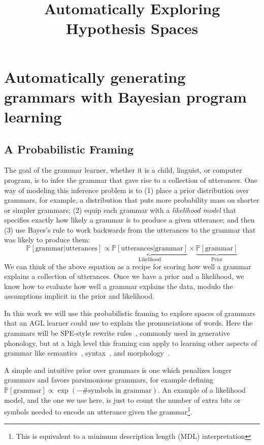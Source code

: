 \documentclass{article}
\title{Automatically Exploring Hypothesis Spaces}
\newcommand{\probability}{\mathds{P}} %
\begin{document}
\maketitle


\section{Automatically generating grammars with Bayesian program learning}

\subsection{A Probabilistic Framing}

The goal of the grammar learner, whether it is a child, linguist, or computer program, is to
infer the grammar that gave rise to
a collection of utterances.
One way of
modeling this inference problem is to (1) place a prior distribution over grammars, for example, a distribution that puts more probability mass on shorter or simpler grammars; (2) equip each grammar with a
\emph{likelihood model} that specifies exactly how likely a grammar is to produce a given utterance;
and then (3) use Bayes's rule to work backwards from the
utterances to the grammar that was likely to produce them:
\begin{equation}
  \probability\left[\text{grammar}|\text{utterances} \right]\propto\underbrace{\probability\left[\text{utterances}|\text{grammar} \right]}_{\text{Likelihood}}\times\underbrace{\probability\left[\text{grammar} \right]}_{\text{Prior}}\label{posterior}
\end{equation}
We can think of the above equation as a recipe for
scoring how well a grammar explains a
collection of utterances.
Once we have a prior and a likelihood,
we know how to evaluate how well a grammar explains the data, modulo the assumptions implicit in the
prior and likelihood.

In this work we will use this probabilistic framing
to explore spaces of grammars
that an AGL learner could use to explain
the pronunciations of words.
Here the grammars will be SPE-style rewrite rules~\cite{chomsky1968sound},
commonly used in generative phonology,
but at a high level this framing can apply to
learning other aspects of grammar like semantics~\cite{piantadosi2011learning}, syntax~\cite{perfors2011learnability}, and morphology~\cite{tim}.

A simple and intuitive prior over grammars is one which penalizes longer grammars and favors parsimonious grammars, for example defining $\probability\left[\text{grammar} \right]\propto\exp\left(- \text{\# symbols in grammar} \right)$. An example of a likelihood model,
and the one we use here,
is just to count the number of extra bits or symbols needed to encode an utterance given the grammar\footnote{This is equivalent to a minimum description length (MDL) interpretation}.
\end{document}
